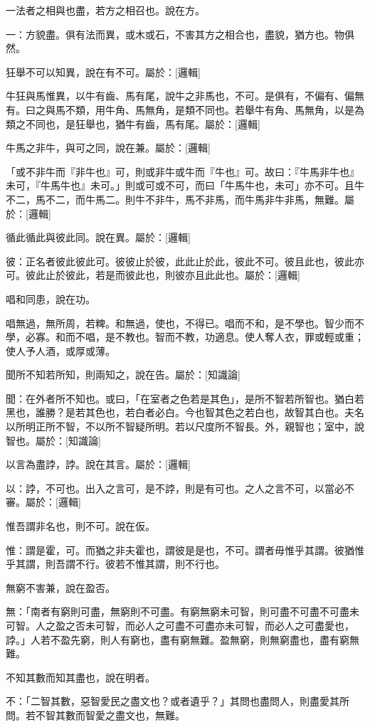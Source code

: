 \begin{pinyinscope}
一法者之相與也盡，若方之相召也。說在方。

一：方貌盡。俱有法而異，或木或石，不害其方之相合也，盡貌，猶方也。物俱然。

狂舉不可以知異，說在有不可。屬於：[邏輯]

牛狂與馬惟異，以牛有齒、馬有尾，說牛之非馬也，不可。是俱有，不偏有、偏無有。曰之與馬不類，用牛角、馬無角，是類不同也。若舉牛有角、馬無角，以是為類之不同也，是狂舉也，猶牛有齒，馬有尾。屬於：[邏輯]

牛馬之非牛，與可之同，說在兼。屬於：[邏輯]

「或不非牛而『非牛也』可，則或非牛或牛而『牛也』可。故曰：『牛馬非牛也』未可，『牛馬牛也』未可。」則或可或不可，而曰「牛馬牛也，未可」亦不可。且牛不二，馬不二，而牛馬二。則牛不非牛，馬不非馬，而牛馬非牛非馬，無難。屬於：[邏輯]

循此循此與彼此同。說在異。屬於：[邏輯]

彼：正名者彼此彼此可。彼彼止於彼，此此止於此，彼此不可。彼且此也，彼此亦可。彼此止於彼此，若是而彼此也，則彼亦且此此也。屬於：[邏輯]

唱和同患，說在功。

唱無過，無所周，若粺。和無過，使也，不得已。唱而不和，是不學也。智少而不學，必寡。和而不唱，是不教也。智而不教，功適息。使人奪人衣，罪或輕或重；使人予人酒，或厚或薄。

聞所不知若所知，則兩知之，說在告。屬於：[知識論]

聞：在外者所不知也。或曰，「在室者之色若是其色」，是所不智若所智也。猶白若黑也，誰勝？是若其色也，若白者必白。今也智其色之若白也，故智其白也。夫名以所明正所不智，不以所不智疑所明。若以尺度所不智長。外，親智也；室中，說智也。屬於：[知識論]

以言為盡誖，誖。說在其言。屬於：[邏輯]

以：誖，不可也。出入之言可，是不誖，則是有可也。之人之言不可，以當必不審。屬於：[邏輯]

惟吾謂非名也，則不可。說在仮。

惟：謂是霍，可。而猶之非夫霍也，謂彼是是也，不可。謂者毋惟乎其謂。彼猶惟乎其謂，則吾謂不行。彼若不惟其謂，則不行也。

無窮不害兼，說在盈否。

無：「南者有窮則可盡，無窮則不可盡。有窮無窮未可智，則可盡不可盡不可盡未可智。人之盈之否未可智，而必人之可盡不可盡亦未可智，而必人之可盡愛也，誖。」人若不盈先窮，則人有窮也，盡有窮無難。盈無窮，則無窮盡也，盡有窮無難。

不知其數而知其盡也，說在明者。

不：「二智其數，惡智愛民之盡文也？或者遺乎？」其問也盡問人，則盡愛其所問。若不智其數而智愛之盡文也，無難。


\end{pinyinscope}
